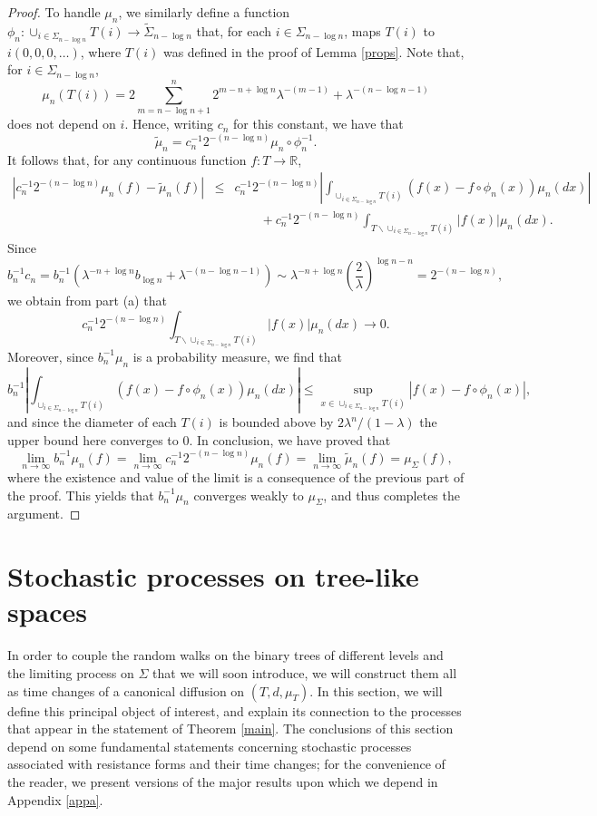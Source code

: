 \documentclass[a4paper, 11pt]{article}
\begin{document}
\begin{proof}
To handle $\mu_n$, we similarly define a function ${\phi}_n:\cup_{i\in\Sigma_{n-\log n}}T(i)\rightarrow\tilde{\Sigma}_{n-\log n}$ that, for each $i\in\Sigma_{n-\log n}$, maps $T(i)$ to $i(0,0,0,\dots)$, where $T(i)$ was defined in the proof of Lemma \ref{props}. Note that, for $i\in\Sigma_{n-\log n}$,
\[\mu_n\left(T(i)\right)=2\sum_{m=n-\log n+1}^n2^{m-n+\log n}\lambda^{-(m-1)}+\lambda^{-(n-\log n-1)}\]
does not depend on $i$. Hence, writing $c_n$ for this constant, we have that
\[\tilde{\mu}_n=c_n^{-1}2^{-(n-\log n)}\mu_n\circ\phi_n^{-1}.\]
It follows that, for any continuous function $f:T\rightarrow \mathbb{R}$,
\begin{eqnarray*}
\left|c_n^{-1}2^{-(n-\log n)}{\mu}_n(f)-\tilde{\mu}_n(f)\right|&\leq &c_n^{-1}2^{-(n-\log n)}\left|\int_{\cup_{i\in\Sigma_{n-\log n}}T(i)}\left(f(x)-f\circ{\phi}_n(x)\right)\mu_n(dx)\right|\\
&&\qquad+c_n^{-1}2^{-(n-\log n)}\int_{T\backslash\cup_{i\in\Sigma_{n-\log n}}T(i) }\left|f(x)\right|\mu_n(dx).
\end{eqnarray*}
Since
\[b_n^{-1}c_n=b_n^{-1}\left(\lambda^{-n+\log n}b_{\log n}+\lambda^{-(n-\log n-1)}\right)\sim \lambda^{-n+\log n}\left(\frac{2}{\lambda}\right)^{\log n-n}=2^{-(n-\log n)},\]
we obtain from part (a) that
\[c_n^{-1}2^{-(n-\log n)}\int_{T\backslash\cup_{i\in\Sigma_{n-\log n}}T(i) }\left|f(x)\right|\mu_n(dx)\rightarrow 0.\]
Moreover, since $b_n^{-1}\mu_n$ is a probability measure, we find that
\[b_n^{-1}\left|\int_{\cup_{i\in\Sigma_{n-\log n}}T(i)}\left(f(x)-f\circ{\phi}_n(x)\right)\mu_n(dx)\right|\leq \sup_{x\in\cup_{i\in\Sigma_{n-\log n}}T(i)}\left|f(x)-f\circ{\phi}_n(x)\right|,\]
and since the diameter of each $T(i)$ is bounded above by $2\lambda^n/(1-\lambda)$ the upper bound here converges to 0. In conclusion, we have proved that
\[\lim_{n\rightarrow\infty}b_n^{-1}\mu_n(f)=\lim_{n\rightarrow\infty}c_n^{-1}2^{-(n-\log n)}{\mu}_n(f)=\lim_{n\rightarrow\infty}\tilde{\mu}_n(f)=\mu_\Sigma(f),\]
where the existence and value of the limit is a consequence of the previous part of the proof. This yields that $b_n^{-1}{\mu}_n$ converges weakly to $\mu_\Sigma$, and thus completes the argument.
\end{proof}

\section{Stochastic processes on tree-like spaces}\label{sec3}

In order to couple the random walks on the binary trees of different levels and the limiting process on $\Sigma$ that we will soon introduce, we will construct them all as time changes of a canonical diffusion on $(T,d,\mu_T)$. In this section, we will define this principal object of interest, and explain its connection to the processes that appear in the statement of Theorem \ref{main}. The conclusions of this section depend on some fundamental statements concerning stochastic processes associated with resistance forms and their time changes; for the convenience of the reader, we present versions of the major results upon which we depend in Appendix \ref{appa}.
\end{document}
